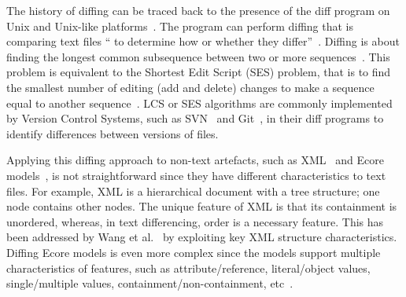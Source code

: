 The history of diffing can be traced back to the presence of the \textsf{diff} program on Unix and Unix-like platforms~\cite{hunt1976algorithm}. The program can perform diffing that is comparing text files `` to determine how or whether they differ''~\cite{diff}. Diffing is about finding the longest common subsequence between two or more sequences~\cite{bergroth2000lcs}. This problem is equivalent to the Shortest Edit Script (SES) problem, that is to find the smallest number of editing (add and delete) changes to make a sequence equal to another sequence~\cite{DBLP:journals/algorithmica/Meyers86}. LCS or SES algorithms are commonly implemented by Version Control Systems, such as SVN~\cite{svn-diff} and Git~\cite{git-diff}, in their \textsf{diff} programs to identify differences between versions of files.   

Applying this diffing approach to non-text artefacts, such as XML~\cite{w3c-xml} and Ecore models~\cite{steinberg2008emf}, is not straightforward since they have different characteristics to text files. For example, XML is a hierarchical document with a tree structure; one node contains other nodes. The unique feature of XML is that its containment is unordered, whereas, in text differencing, order is a necessary feature. This has been addressed by Wang et al.~\cite{wang2003xdiff} by exploiting key XML  structure characteristics. Diffing Ecore models is even more complex since the models support multiple characteristics of features, such as attribute/reference, literal/object values, single/multiple values, containment/non-containment, etc~\cite{steinberg2008emf}. 

